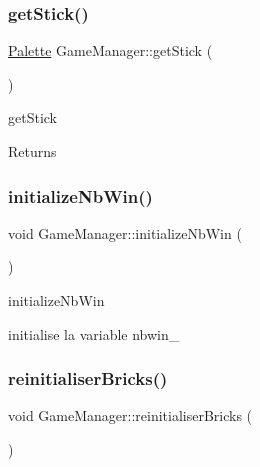 \subsubsection{\texorpdfstring{get\+Stick()}{getStick()}}
{\footnotesize\ttfamily \mbox{\hyperlink{class_palette}{Palette}} Game\+Manager\+::get\+Stick (\begin{DoxyParamCaption}{ }\end{DoxyParamCaption})\hspace{0.3cm}{\ttfamily [inline]}}



get\+Stick 

\begin{DoxyReturn}{Returns}

\end{DoxyReturn}
\mbox{\label{class_game_manager_aec56f391111fb15f43711719da20e407}} 
\subsubsection{\texorpdfstring{initialize\+Nb\+Win()}{initializeNbWin()}}
{\footnotesize\ttfamily void Game\+Manager\+::initialize\+Nb\+Win (\begin{DoxyParamCaption}{ }\end{DoxyParamCaption})\hspace{0.3cm}{\ttfamily [inline]}}



initialize\+Nb\+Win 

initialise la variable nbwin\+\_\+ \mbox{\label{class_game_manager_a982951601283ec375c115cd3f19b64a2}} 
\subsubsection{\texorpdfstring{reinitialiser\+Bricks()}{reinitialiserBricks()}}
{\footnotesize\ttfamily void Game\+Manager\+::reinitialiser\+Bricks (\begin{DoxyParamCaption}{ }\end{DoxyParamCaption})}




